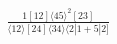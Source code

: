 \documentclass[varwidth, border=5pt]{standalone}
\begin{document}
\begin{my}
$\begin{gathered}
\scriptscriptstyle\frac{1[12]⟨45⟩^2[23]}{⟨12⟩[24]⟨34⟩⟨2|1+5|2]}
\end{gathered}$
\end{my}
\end{document}

